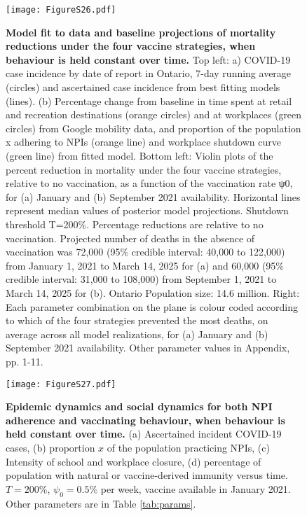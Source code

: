 \documentclass[10pt,onecolumn,twoside,lineno]{pnas-new}
\begin{document}
\begin{figure}[H]
\centering
\texttt{[image: FigureS26.pdf]}
\caption{\textbf{Model fit to data and baseline projections of mortality reductions under the four vaccine strategies, when behaviour is held constant over time.} Top left: a) COVID-19 case incidence by date of report in Ontario, 7-day running average (circles) and ascertained case incidence from best fitting models (lines). (b) Percentage change from baseline in time spent at retail and recreation destinations (orange circles) and at workplaces (green circles) from Google mobility data, and proportion of the population x adhering to NPIs (orange line) and workplace shutdown curve (green line) from fitted model. Bottom left: Violin plots of the percent reduction in mortality under the four vaccine strategies, relative to no vaccination, as a function of the vaccination rate ψ0, for (a) January and (b) September 2021 availability. Horizontal lines represent median values of posterior model projections. Shutdown threshold T=200\%. Percentage reductions are relative to no vaccination. Projected number of deaths in the absence of vaccination was 72,000 (95\% credible interval: 40,000 to 122,000) from January 1, 2021 to March 14, 2025 for (a) and 60,000 (95\% credible interval: 31,000 to 108,000) from September 1, 2021 to March 14, 2025 for (b).  Ontario Population size: 14.6 million.  Right:  Each parameter combination on the plane is colour coded according to which of the four strategies prevented the most deaths, on average across all model realizations, for (a) January and (b) September 2021 availability. Other parameter values in Appendix, pp. 1-11.}
\label{plot_model}
\end{figure}

\clearpage 

\begin{figure}[H]
\centering
\texttt{[image: FigureS27.pdf]}
\caption{\textbf{Epidemic dynamics and social dynamics for both NPI adherence and vaccinating behaviour, when behaviour is held constant over time.} (a) Ascertained incident COVID-19 cases, (b) proportion $x$ of the population practicing NPIs, (c) Intensity of school and workplace closure, (d) percentage of population with natural or vaccine-derived immunity versus time. $T=200 \%$, $\psi_0=0.5 \%$ per week, vaccine available in January 2021. Other parameters are in Table \ref{tab:params}.}
\label{plot_model}
\end{figure}

\clearpage 
\end{document}
